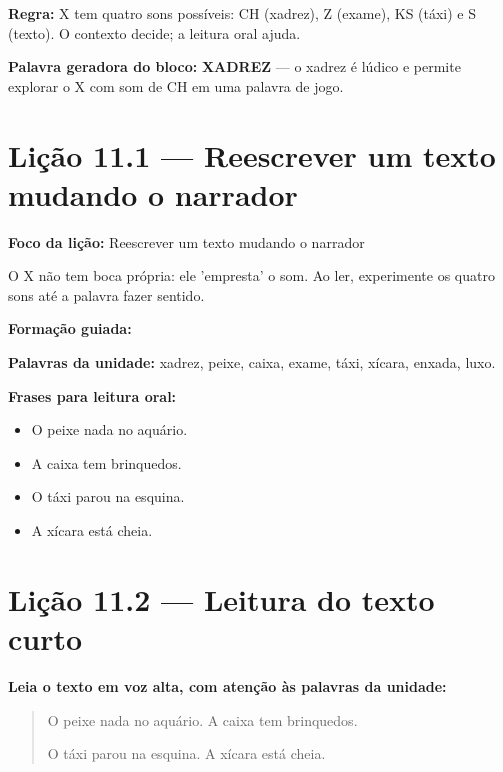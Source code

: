 \textbf{Regra:} X tem quatro sons possíveis: CH (xadrez), Z (exame), KS (táxi) e S (texto). O contexto decide; a leitura oral ajuda.

\textbf{Palavra geradora do bloco:} \textbf{XADREZ} --- o xadrez é lúdico e permite explorar o X com som de CH em uma palavra de jogo.

\section{Lição 11.1 --- Reescrever um texto mudando o narrador}

\textbf{Foco da lição:} Reescrever um texto mudando o narrador


\begin{boquinha}
O X não tem boca própria: ele 'empresta' o som. Ao ler, experimente os quatro sons até a palavra fazer sentido.
\end{boquinha}

\noindent\textbf{Formação guiada:}

\begin{center}
\end{center}

\noindent\textbf{Palavras da unidade:} xadrez, peixe, caixa, exame, táxi, xícara, enxada, luxo.

\noindent\textbf{Frases para leitura oral:}
\begin{itemize}[leftmargin=1.6em]
  \item O peixe nada no aquário.
  \item A caixa tem brinquedos.
  \item O táxi parou na esquina.
  \item A xícara está cheia.
\end{itemize}

\section{Lição 11.2 --- Leitura do texto curto}

\noindent\textbf{Leia o texto em voz alta, com atenção às palavras da unidade:}


\begin{quote}
O peixe nada no aquário. A caixa tem brinquedos.

O táxi parou na esquina. A xícara está cheia.
\end{quote}

